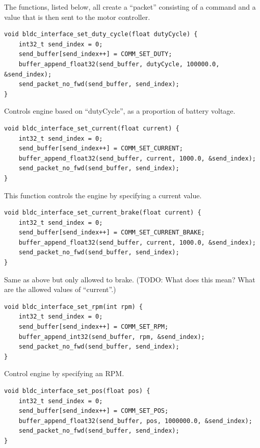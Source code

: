 \documentclass[12pt]{article} %
\begin{document}
The functions, listed below, all create a ``packet'' consisting of a
command and a value that is then sent to the motor controller.


\begin{Verbatim}[samepage=true,frame=single,label=Embedded/RC\_Controller/bldc\_interface.c]
void bldc_interface_set_duty_cycle(float dutyCycle) {
	int32_t send_index = 0;
	send_buffer[send_index++] = COMM_SET_DUTY;
	buffer_append_float32(send_buffer, dutyCycle, 100000.0, &send_index);
	send_packet_no_fwd(send_buffer, send_index);
}
\end{Verbatim}

Controls engine based on ``dutyCycle'', as a proportion of battery voltage. 


\begin{Verbatim}[samepage=true,frame=single,label=Embedded/RC\_Controller/bldc\_interface.c]
void bldc_interface_set_current(float current) {
	int32_t send_index = 0;
	send_buffer[send_index++] = COMM_SET_CURRENT;
	buffer_append_float32(send_buffer, current, 1000.0, &send_index);
	send_packet_no_fwd(send_buffer, send_index);
}
\end{Verbatim}

This function controls the engine by specifying a current value. 

\begin{Verbatim}[samepage=true,frame=single,label=Embedded/RC\_Controller/bldc\_interface.c]
void bldc_interface_set_current_brake(float current) {
	int32_t send_index = 0;
	send_buffer[send_index++] = COMM_SET_CURRENT_BRAKE;
	buffer_append_float32(send_buffer, current, 1000.0, &send_index);
	send_packet_no_fwd(send_buffer, send_index);
}
\end{Verbatim}

Same as above but only allowed to brake. (TODO: What does this mean? What are the allowed values of ``current''.)

\begin{Verbatim}[samepage=true,frame=single,label=Embedded/RC\_Controller/bldc\_interface.c]
void bldc_interface_set_rpm(int rpm) {
	int32_t send_index = 0;
	send_buffer[send_index++] = COMM_SET_RPM;
	buffer_append_int32(send_buffer, rpm, &send_index);
	send_packet_no_fwd(send_buffer, send_index);
}
\end{Verbatim}

Control engine by specifying an RPM. 

\begin{Verbatim}[samepage=true,frame=single,label=Embedded/RC\_Controller/bldc\_interface.c]
void bldc_interface_set_pos(float pos) {
	int32_t send_index = 0;
	send_buffer[send_index++] = COMM_SET_POS;
	buffer_append_float32(send_buffer, pos, 1000000.0, &send_index);
	send_packet_no_fwd(send_buffer, send_index);
}
\end{Verbatim}
\end{document}
